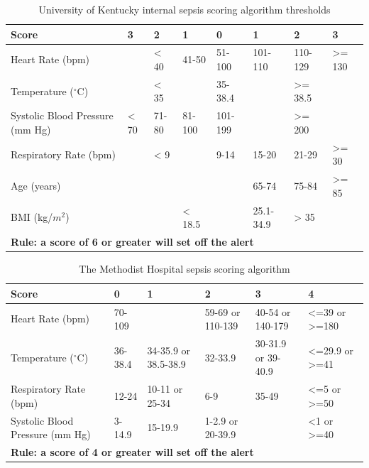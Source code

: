 \documentclass{sig-alternate}
\begin{document}
\begin{table}
\begin{center}
\renewcommand{\arraystretch}{1.5}
  \begin{tabular}{| l | l | l | l | l | l | l | l |}
\hline

{\bf Score} & {\bf 3} & {\bf 2} & {\bf 1} & {\bf 0} & {\bf 1} & {\bf 2} & {\bf 3}\\ \hline
Heart Rate (bpm) & & < 40 & 41-50 & 51-100 & 101-110 & 110-129 & >= 130\\ \hline
Temperature ($^\circ$C) & & < 35 & & 35-38.4 & & >= 38.5 &\\ \hline
Systolic Blood Pressure (mm Hg) & < 70 & 71-80 & 81-100 & 101-199 & & >= 200 & \\ \hline
Respiratory Rate (bpm) & & < 9 & & 9-14 & 15-20 & 21-29 & >= 30\\ \hline
Age (years) & & & & & 65-74 & 75-84 & >= 85\\ \hline
BMI (kg/$m^2$) & & & < 18.5 & & 25.1-34.9 & > 35 & \\ \hline
 \multicolumn{8}{|l|}{\bf Rule: a score of 6 or greater will set off the alert} \\ \hline
 \end{tabular}
	\caption{University of Kentucky internal sepsis scoring algorithm thresholds}
  \label{tab:uk_table}
\end{center}
\end{table}

\begin{table}
\renewcommand{\arraystretch}{1.5}
  \begin{tabular}{| l | l | l | l | l | l |}
\hline

{\bf Score} & {\bf 0} & {\bf 1} & {\bf 2} & {\bf 3} & {\bf 4}\\ \hline
Heart Rate (bpm) & 70-109 & & 59-69 or 110-139 & 40-54 or 140-179 & <=39 or >=180\\ \hline
Temperature ($^\circ$C) & 36-38.4 & 34-35.9 or 38.5-38.9 & 32-33.9 & 30-31.9 or 39-40.9 & <=29.9 or >=41\\ \hline
Respiratory Rate (bpm) & 12-24 & 10-11 or 25-34 & 6-9 & 35-49 & <=5 or >=50\\ \hline
Systolic Blood Pressure (mm Hg) & 3-14.9 & 15-19.9 & 1-2.9 or 20-39.9 & & <1 or >=40\\ \hline
 \multicolumn{6}{|l|}{\bf Rule: a score of 4 or greater will set off the alert} \\ \hline
 \end{tabular}
	\caption{The Methodist Hospital sepsis scoring algorithm}
  \label{tab:mh_table}
\end{table}
\end{document}
